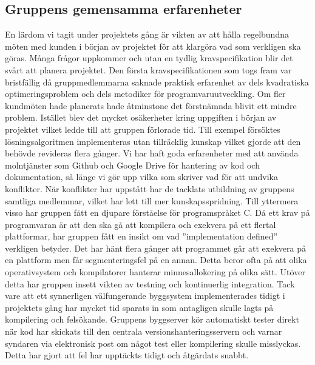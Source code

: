 \subsection{Gruppens gemensamma erfarenheter}
En lärdom vi tagit under projektets gång är vikten av att hålla regelbundna möten med kunden i början av projektet för att klargöra vad som verkligen ska göras. Många frågor uppkommer och utan en tydlig kravspecifikation blir det svårt att planera projektet. Den första kravspecifikationen som togs fram var bristfällig då gruppmedlemmarna saknade praktisk erfarenhet av dels kvadratiska optimeringsproblem och dels metodiker för programvaruutveckling. Om fler kundmöten hade planerats hade åtminstone det förstnämnda blivit ett mindre problem. Istället blev det mycket osäkerheter kring uppgiften i början av projektet vilket ledde till att gruppen förlorade tid. Till exempel försöktes lösningsalgoritmen implementeras utan tillräcklig kunskap vilket gjorde att den behövde revideras flera gånger.
\newline
\newline
Vi har haft goda erfarenheter med att använda molntjänster som Github och Google Drive för hantering av kod och dokumentation, så länge vi gör upp vilka som skriver vad för att undvika konflikter. När konflikter har uppstått har de tacklats utbildning av gruppens samtliga medlemmar, vilket har lett till mer kunskapsspridning.
\newline
\newline
Till yttermera visso har gruppen fått en djupare förståelse för programspråket C. Då ett krav på programvaran är att den ska gå att kompilera och exekvera på ett flertal plattformar, har gruppen fått en insikt om vad ''implementation defined'' verkligen betyder. Det har hänt flera gånger att programmet går att exekvera på en plattform men får segmenteringsfel på en annan. Detta beror ofta på att olika operativsystem och kompilatorer hanterar minnesallokering på olika sätt.
\newline
\newline
Utöver detta har gruppen insett vikten av testning och kontinuerlig integration. Tack vare att ett synnerligen välfungerande byggsystem implementerades tidigt i projektets gång har mycket tid sparats in som antagligen skulle lagts på kompilering och felsökande. Gruppens byggserver kör automatiskt tester direkt när kod har skickats till den centrala versionshanteringsservern och varnar syndaren via elektronisk post om något test eller kompilering skulle misslyckas. Detta har gjort att fel har upptäckts tidigt och åtgärdats snabbt.

